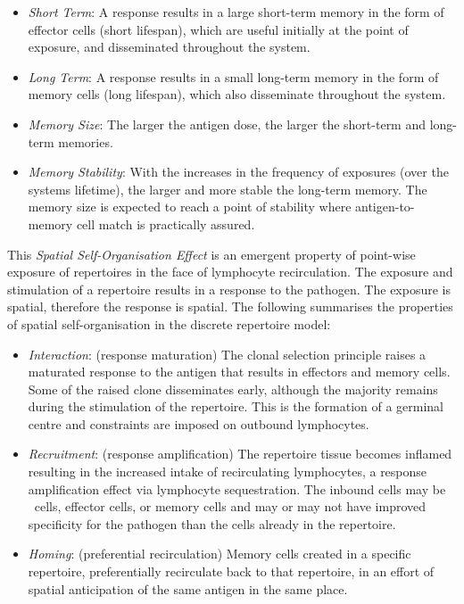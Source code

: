 \begin{itemize}
	\item \emph{Short Term}: A response results in a large short-term memory in the form of effector cells (short lifespan), which are useful initially at the point of exposure, and disseminated throughout the system.
	\item \emph{Long Term}: A response results in a small long-term memory in the form of memory cells (long lifespan), which also disseminate throughout the system.
	\item \emph{Memory Size}: The larger the antigen dose, the larger the short-term and long-term memories.
	\item \emph{Memory Stability}: With the increases in the frequency of exposures (over the systems lifetime), the larger and more stable the long-term memory. The memory size is expected to reach a point of stability where antigen-to-memory cell match is practically assured.
\end{itemize}

This \emph{Spatial Self-Organisation Effect} is an emergent property of point-wise exposure of repertoires in the face of lymphocyte recirculation. The exposure and stimulation of a repertoire results in a response to the pathogen. The exposure is spatial, therefore the response is spatial. The following summarises the properties of spatial self-organisation in the discrete repertoire model:

\begin{itemize}
	\item \emph{Interaction}: (response maturation) The clonal selection principle raises a maturated response to the antigen that results in effectors and memory cells. Some of the raised clone disseminates early, although the majority remains during the stimulation of the repertoire. This is the formation of a germinal centre and constraints are imposed on outbound lymphocytes.
	\item \emph{Recruitment}: (response amplification) The repertoire tissue becomes inflamed resulting in the increased intake of recirculating lymphocytes, a response amplification effect via lymphocyte sequestration. The inbound cells may be \naive\ cells, effector cells, or memory cells and may or may not have improved specificity for the pathogen than the cells already in the repertoire.
	\item \emph{Homing}: (preferential recirculation) Memory cells created in a specific repertoire, preferentially recirculate back to that repertoire, in an effort of spatial anticipation of the same antigen in the same place.
\end{itemize}

